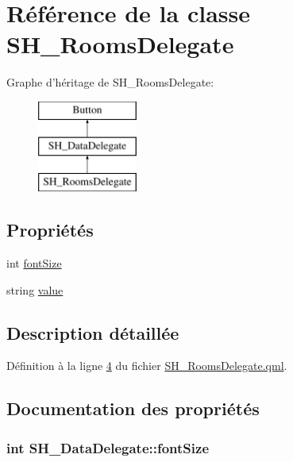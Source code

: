 \hypertarget{classSH__RoomsDelegate}{\section{Référence de la classe S\-H\-\_\-\-Rooms\-Delegate}
\label{classSH__RoomsDelegate}
}
Graphe d'héritage de S\-H\-\_\-\-Rooms\-Delegate\-:\begin{figure}[H]
\begin{center}
\leavevmode
\includegraphics[height=3.000000cm]{classSH__RoomsDelegate}
\end{center}
\end{figure}
\subsection*{Propriétés}
\begin{DoxyCompactItemize}
\item 
int \hyperlink{classSH__DataDelegate_afbb41ad9b513c7f27e7b5ad90d82e95b}{font\-Size}
\item 
string \hyperlink{classSH__DataDelegate_acb9da3c73493c88865e08d9575f26482}{value}
\end{DoxyCompactItemize}


\subsection{Description détaillée}


Définition à la ligne \hyperlink{SH__RoomsDelegate_8qml_source_l00004}{4} du fichier \hyperlink{SH__RoomsDelegate_8qml_source}{S\-H\-\_\-\-Rooms\-Delegate.\-qml}.



\subsection{Documentation des propriétés}
\hypertarget{classSH__DataDelegate_afbb41ad9b513c7f27e7b5ad90d82e95b}{
\subsubsection[{font\-Size}]{\setlength{\rightskip}{0pt plus 5cm}int S\-H\-\_\-\-Data\-Delegate\-::font\-Size\hspace{0.3cm}{\ttfamily [inherited]}}}\label{classSH__DataDelegate_afbb41ad9b513c7f27e7b5ad90d82e95b}


